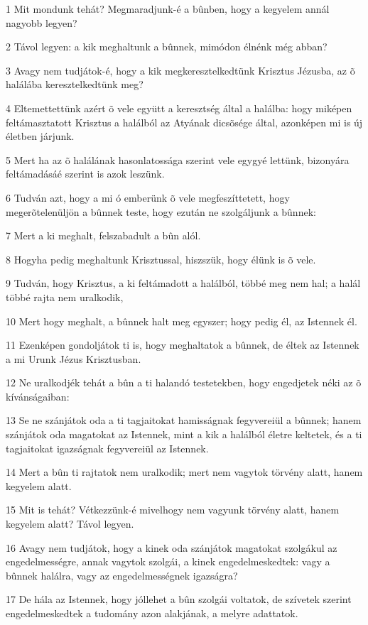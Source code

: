 \par 1 Mit mondunk tehát? Megmaradjunk-é a bûnben, hogy a kegyelem annál nagyobb legyen?
\par 2 Távol legyen: a kik meghaltunk a bûnnek, mimódon élnénk még abban?
\par 3 Avagy nem tudjátok-é, hogy a kik megkeresztelkedtünk Krisztus Jézusba, az õ halálába keresztelkedtünk meg?
\par 4 Eltemettettünk azért õ vele együtt a keresztség által a halálba: hogy miképen feltámasztatott Krisztus a halálból az Atyának dicsõsége által, azonképen mi is új életben  járjunk.
\par 5 Mert ha az õ halálának hasonlatossága szerint vele egygyé lettünk, bizonyára feltámadásáé szerint is azok leszünk.
\par 6 Tudván azt, hogy a mi ó emberünk õ vele megfeszíttetett, hogy megerõtelenüljön a bûnnek teste, hogy ezután ne szolgáljunk a bûnnek:
\par 7 Mert a ki meghalt, felszabadult a bûn alól.
\par 8 Hogyha pedig meghaltunk Krisztussal, hiszszük, hogy élünk is õ vele.
\par 9 Tudván, hogy Krisztus, a ki feltámadott a halálból, többé meg nem hal; a halál többé rajta nem uralkodik,
\par 10 Mert hogy meghalt, a bûnnek halt meg egyszer; hogy pedig él, az Istennek él.
\par 11 Ezenképen gondoljátok ti is, hogy meghaltatok a bûnnek, de éltek az Istennek a mi Urunk Jézus Krisztusban.
\par 12 Ne uralkodjék tehát a bûn a ti halandó testetekben, hogy engedjetek néki az õ kívánságaiban:
\par 13 Se ne szánjátok oda a ti tagjaitokat hamisságnak fegyvereiül a bûnnek; hanem szánjátok oda magatokat az Istennek, mint a kik a halálból életre keltetek, és a ti tagjaitokat igazságnak fegyvereiül az Istennek.
\par 14 Mert a bûn ti rajtatok nem uralkodik; mert nem vagytok törvény alatt, hanem kegyelem alatt.
\par 15 Mit is tehát? Vétkezzünk-é mivelhogy nem vagyunk törvény alatt, hanem kegyelem alatt? Távol legyen.
\par 16 Avagy nem tudjátok, hogy a kinek oda szánjátok magatokat szolgákul az engedelmességre, annak vagytok szolgái, a kinek engedelmeskedtek: vagy a bûnnek halálra, vagy az engedelmességnek igazságra?
\par 17 De hála az Istennek, hogy jóllehet a bûn szolgái voltatok, de szívetek szerint engedelmeskedtek a tudomány azon alakjának, a melyre adattatok.
